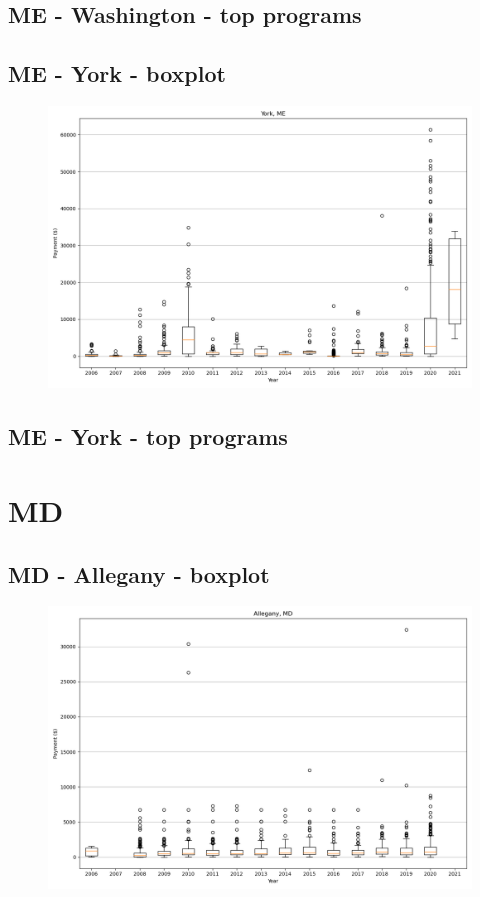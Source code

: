 \subsection*{ME - Washington - top programs}

\newpage
\subsection*{ME - York - boxplot}
\begin{figure}[h]
\centering
\includegraphics[width=7in]{../output/boxplots/counties/York-ME_boxplot.png}
\end{figure}


\subsection*{ME - York - top programs}

\newpage
\section*{MD}
\subsection*{MD - Allegany - boxplot}
\begin{figure}[h]
\centering
\includegraphics[width=7in]{../output/boxplots/counties/Allegany-MD_boxplot.png}
\end{figure}



